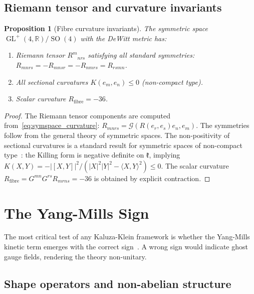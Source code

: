 \documentclass[12pt,a4paper]{article}
\newtheorem{proposition}[theorem]{Proposition}
\theoremstyle{definition}
\newcommand{\GL}{\operatorname{GL}}
\newcommand{\SO}{\operatorname{SO}}
\newcommand{\R}{\mathbb{R}}
\begin{document}
\subsection{Riemann tensor and curvature invariants}

\begin{proposition}[Fibre curvature invariants]
\label{prop:fibre_curv}
The symmetric space $\GL^+(4,\R)/\SO(4)$ with the DeWitt metric has:
\begin{enumerate}[nosep]
\item Riemann tensor $R^m{}_{nrs}$ satisfying all standard symmetries: $R_{mnrs} = -R_{mnsr} = -R_{nmrs} = R_{rsmn}$.
\item All sectional curvatures $K(e_m, e_n) \leq 0$ (non-compact type).
\item Scalar curvature $R_{\mathrm{fibre}} = -36$.
\end{enumerate}
\end{proposition}

\begin{proof}
The Riemann tensor components are computed from~\eqref{eq:symspace_curvature}:
$R_{mnrs} = \mathcal{G}(R(e_r, e_s)e_n, e_m)$.
The symmetries follow from the general theory of symmetric spaces.
The non-positivity of sectional curvatures is a standard result for symmetric spaces of non-compact type~\cite{Helgason1978}: the Killing form is negative definite on $\mathfrak{k}$, implying $K(X,Y) = -|[X,Y]|^2/(|X|^2|Y|^2 - \langle X,Y\rangle^2) \leq 0$.
The scalar curvature $R_{\mathrm{fibre}} = G^{mn} G^{rs} R_{mrns} = -36$ is obtained by explicit contraction.
\end{proof}


\section{The Yang-Mills Sign}
\label{sec:yang_mills}

The most critical test of any Kaluza-Klein framework is whether the Yang-Mills kinetic term emerges with the correct sign~\cite{Bailin1987}.
A wrong sign would indicate ghost gauge fields, rendering the theory non-unitary.

\subsection{Shape operators and non-abelian structure}
\end{document}
